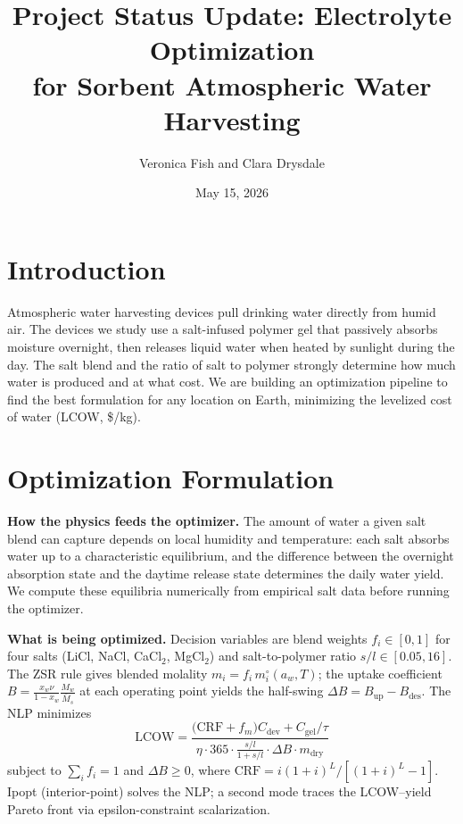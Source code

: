 \documentclass[11pt]{article}
\title{Project Status Update: Electrolyte Optimization\\for Sorbent Atmospheric Water Harvesting}
\author{Veronica Fish and Clara Drysdale}
\date{May 15, 2026}
\begin{document}
\maketitle
\vspace{-2em}

\section*{Introduction}
\vspace{-0.8em}

Atmospheric water harvesting devices pull drinking water directly from humid air. The devices we study use a salt-infused polymer gel that passively absorbs moisture overnight, then releases liquid water when heated by sunlight during the day. The salt blend and the ratio of salt to polymer strongly determine how much water is produced and at what cost. We are building an optimization pipeline to find the best formulation for any location on Earth, minimizing the levelized cost of water (LCOW, \$/kg).
\vspace{-1em}
\section*{Optimization Formulation}
\vspace{-0.8em}
\textbf{How the physics feeds the optimizer.}
The amount of water a given salt blend can capture depends on local humidity and temperature: each salt absorbs water up to a characteristic equilibrium, and the difference between the overnight absorption state and the daytime release state determines the daily water yield. We compute these equilibria numerically from empirical salt data before running the optimizer.

\textbf{What is being optimized.}
Decision variables are blend weights $f_i\!\in\![0,1]$ for four salts (LiCl, NaCl, CaCl$_2$, MgCl$_2$) and salt-to-polymer ratio $s/l\!\in\![0.05,16]$. The ZSR rule gives blended molality $m_i = f_i\,m_i^\circ(a_w,T)$; the uptake coefficient $B = \frac{x_w\nu}{1-x_w}\frac{M_w}{\bar{M}_s}$ at each operating point yields the half-swing $\Delta B = B_\mathrm{up}-B_\mathrm{des}$. The NLP minimizes
\begin{equation*}
  \mathrm{LCOW} = \frac{\bigl(\mathrm{CRF}+f_m\bigr)C_\mathrm{dev} + C_\mathrm{gel}/\tau}
                       {\eta\cdot 365\cdot\tfrac{s/l}{1+s/l}\cdot\Delta B\cdot m_\mathrm{dry}}
\end{equation*}
subject to $\sum_i f_i = 1$ and $\Delta B \geq 0$, where $\mathrm{CRF}=i(1+i)^L/[(1+i)^L-1]$. Ipopt (interior-point) solves the NLP; a second mode traces the LCOW--yield Pareto front via epsilon-constraint scalarization.
\vspace{-1em}
\end{document}
